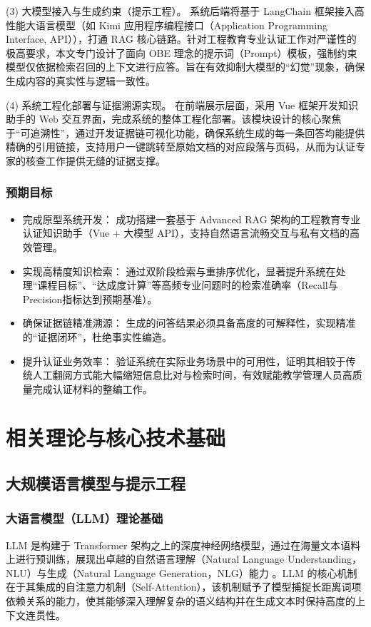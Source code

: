 \documentclass[UTF8,a4paper,zihao=-4]{ctexart}
\begin{document}
(3) 大模型接入与生成约束（提示工程）。 系统后端将基于 LangChain 框架接入高性能大语言模型（如 Kimi 应用程序编程接口（Application Programming Interface, API）），打通 RAG 核心链路。针对工程教育专业认证工作对严谨性的极高要求，本文专门设计了面向 OBE 理念的提示词（Prompt）模板，强制约束模型仅依据检索召回的上下文进行应答。旨在有效抑制大模型的“幻觉”现象，确保生成内容的真实性与逻辑一致性。

(4) 系统工程化部署与证据溯源实现。 在前端展示层面，采用 Vue 框架开发知识助手的 Web 交互界面，完成系统的整体工程化部署。该模块设计的核心聚焦于“可追溯性”，通过开发证据链可视化功能，确保系统生成的每一条回答均能提供精确的引用链接，支持用户一键跳转至原始文档的对应段落与页码，从而为认证专家的核查工作提供无缝的证据支撑。
\subsubsection{预期目标}
\begin{itemize}
    \item 完成原型系统开发： 成功搭建一套基于 Advanced RAG 架构的工程教育专业认证知识助手（Vue + 大模型 API），支持自然语言流畅交互与私有文档的高效管理。

    \item 实现高精度知识检索： 通过双阶段检索与重排序优化，显著提升系统在处理“课程目标”、“达成度计算”等高频专业问题时的检索准确率（Recall与Precision指标达到预期基准）。

    \item 确保证据链精准溯源： 生成的问答结果必须具备高度的可解释性，实现精准的“证据闭环”，杜绝事实性编造。

    \item 提升认证业务效率： 验证系统在实际业务场景中的可用性，证明其相较于传统人工翻阅方式能大幅缩短信息比对与检索时间，有效赋能教学管理人员高质量完成认证材料的整编工作。
\end{itemize}

\section{相关理论与核心技术基础}
\subsection{大规模语言模型与提示工程}
\subsubsection{大语言模型（LLM）理论基础}
LLM 是构建于 Transformer 架构之上的深度神经网络模型，通过在海量文本语料上进行预训练，展现出卓越的自然语言理解（Natural Language Understanding，NLU）与生成（Natural Language Generation，NLG）能力
。LLM 的核心机制在于其集成的自注意力机制（Self-Attention），该机制赋予了模型捕捉长距离词项依赖关系的能力，使其能够深入理解复杂的语义结构并在生成文本时保持高度的上下文连贯性\cite{zhao_merino_2025}。
\end{document}
